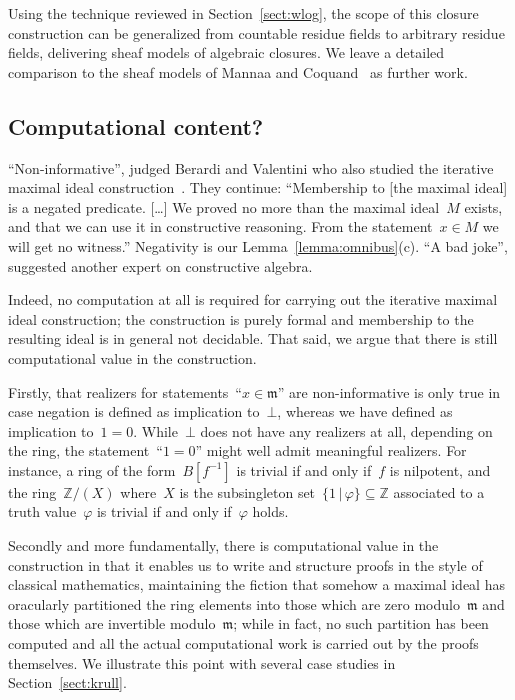\documentclass[com,11pt,crcready]{iosart2x}
\theoremstyle{definition}
\theoremstyle{plain}
\theoremstyle{remark}
\newcommand{\?}{\,{:}\,}
\newcommand{\mmm}{\mathfrak{m}}
\newcommand{\ZZ}{\mathbb{Z}}
\renewcommand{\_}{\mathpunct{.}\,}
\begin{document}
Using the technique reviewed in Section~\ref{sect:wlog}, the scope of this
closure construction can be generalized from countable residue fields to
arbitrary residue fields, delivering sheaf models of algebraic closures. We
leave a detailed comparison to the sheaf models of Mannaa and
Coquand~\cite{mannaa-coquand:alg-closure} as further work.


\subsection{Computational content?}

``Non-informative'', judged Berardi and Valentini who also studied the iterative maximal ideal
construction~\cite[Section~4.2]{berardi-valentini:krivine}. They continue:
``Membership to [the maximal ideal] is a negated predicate. [\ldots\!] We
proved no more than the maximal ideal~$M$ exists, and that we can use it in
constructive reasoning. From the statement~$x \in M$ we will get no witness.''
Negativity is our Lemma~\ref{lemma:omnibus}(c). ``A bad joke'', suggested
another expert on constructive algebra.

Indeed, no computation at all is required for carrying out the iterative
maximal ideal construction; the construction is purely formal and membership to
the resulting ideal is in general not decidable.
That said, we
argue that there is still computational value in the construction.

Firstly, that realizers for statements~``$x \in \mmm$'' are non-informative is only
true in case negation is defined as implication to~$\bot$, whereas we have
defined as implication to~$1 = 0$. While~$\bot$ does not have any realizers at
all, depending on the ring, the statement~``$1 = 0$'' might well admit
meaningful realizers. For instance, a ring of the
form~$B[f^{-1}]$ is trivial if and only if~$f$ is nilpotent, and the
ring~$\ZZ/(X)$ where~$X$ is the subsingleton set~$\{ 1 \,|\, \varphi \}
\subseteq \ZZ$ associated to a truth value~$\varphi$ is trivial if and only
if~$\varphi$ holds.

Secondly and more fundamentally, there is computational value in the
construction in that it enables us to write and structure proofs in the style
of classical mathematics, maintaining the fiction that somehow a maximal ideal
has oracularly partitioned the ring elements into those which are zero
modulo~$\mmm$ and those which are invertible modulo~$\mmm$; while in fact, no
such partition has been computed and all the actual computational work is
carried out by the proofs themselves. We illustrate this point with several
case studies in Section~\ref{sect:krull}.
\end{document}
